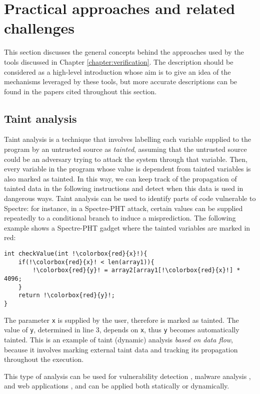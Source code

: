 \documentclass[12pt,a4paper]{book}
\theoremstyle{definition}
\begin{document}
	\section{Practical approaches and related challenges}
	This section discusses the general concepts behind the approaches used by the tools discussed in Chapter \ref{chapter:verification}. The description should be considered as a high-level introduction whose aim is to give an idea of the mechanisms leveraged by these tools, but more accurate descriptions can be found in the papers cited throughout this section.
	\subsection{Taint analysis}\label{sec:taint}
	Taint analysis is a technique that involves labelling each variable supplied to the program by an untrusted source as \textit{tainted}, assuming that the untrusted source could be an adversary trying to attack the system  through that variable.
	Then, every variable in the program whose value is dependent from tainted variables is also marked as tainted. In this way, we can keep track of the propagation of tainted data in the following instructions and detect when this data is used in dangerous ways. Taint analysis can be used to identify parts of code vulnerable to Spectre: for instance, in a Spectre-PHT attack, certain values can be supplied repeatedly to a conditional branch to induce a misprediction. The following example shows a Spectre-PHT gadget where the tainted variables are marked in red:
	
	\vspace{3mm}
	\begin{minipage}{.6\textwidth}
		\begin{lstlisting}[escapechar=!]
int checkValue(int !\colorbox{red}{x}!){
	if(!\colorbox{red}{x}! < len(array1)){
		!\colorbox{red}{y}! = array2[array1[!\colorbox{red}{x}!] * 4096;
	}
	return !\colorbox{red}{y}!;
}
		\end{lstlisting}
	\end{minipage}
	
	The parameter \texttt{x} is supplied by the user, therefore is marked as tainted. The value of \texttt{y}, determined in line 3, depends on \texttt{x}, thus \texttt{y} becomes automatically tainted. This is an example of taint (dynamic) analysis \textit{based on data flow}, because it involves marking external taint data and tracking its propagation throughout the execution.
	
	This type of analysis can be used for vulnerability detection \cite{Newsome2005}, malware analysis \cite{Bayer2009} \cite{Yin2007}, and web applications \cite{Balzarotti2008} \cite{NguyenTuong2005}, and can be applied both statically or dynamically.
	
\end{document}
